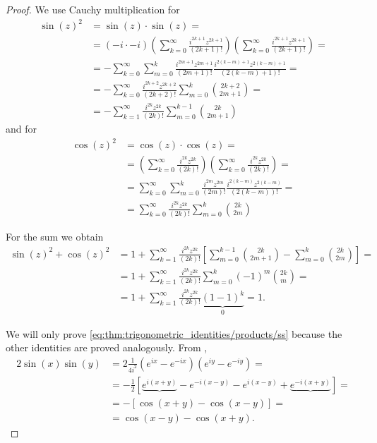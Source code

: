 \begin{proof}
   We use Cauchy multiplication for
  \begin{align*}
    \sin(z)^2
     & =
    \sin(z) \cdot \sin(z)
    =    \\ &=
    (-i \cdot -i) \left( \sum_{k=0}^\infty \frac {i^{2k+1} z^{2k+1}} {(2k+1)!} \right) \left( \sum_{k=0}^\infty \frac {i^{2k+1} z^{2k+1}} {(2k+1)!} \right)
    =    \\ &=
    -\sum_{k=0}^\infty \sum_{m=0}^k \frac {i^{2m+1} z^{2m+1}} {(2m+1)!} \frac {i^{2(k-m)+1} z^{2(k-m)+1}} {(2(k-m)+1)!}
    =    \\ &=
    -\sum_{k=0}^\infty \frac {i^{2k+2} z^{2k+2}} {(2k+2)!} \sum_{m=0}^k \binom {2k+2} {2m+1}
    =    \\ &=
    -\sum_{k=1}^\infty \frac {i^{2k} z^{2k}} {(2k)!} \sum_{m=0}^{k-1} \binom {2k} {2m+1}
  \end{align*}
  and for
  \begin{align*}
    \cos(z)^2
     & =
    \cos(z) \cdot \cos(z)
    =    \\ &=
    \left( \sum_{k=0}^\infty \frac {i^{2k} z^{2k}} {(2k)!} \right) \left( \sum_{k=0}^\infty \frac {i^{2k} z^{2k}} {(2k)!} \right)
    =    \\ &=
    \sum_{k=0}^\infty \sum_{m=0}^k \frac {i^{2m} z^{2m}} {(2m)!} \frac {i^{2(k-m)} z^{2(k-m)}} {(2(k-m))!}
    =    \\ &=
    \sum_{k=0}^\infty \frac {i^{2k} z^{2k}} {(2k)!} \sum_{m=0}^k \binom {2k} {2m}
  \end{align*}

  For the sum we obtain
  \begin{align*}
    \sin(z)^2 + \cos(z)^2
     & =
    1 + \sum_{k=1}^\infty \frac {i^{2k} z^{2k}} {(2k)!} \left[ \sum_{m=0}^{k-1} \binom {2k} {2m+1} - \sum_{m=0}^k \binom {2k} {2m} \right]
    =    \\ &=
    1 + \sum_{k=1}^\infty \frac {i^{2k} z^{2k}} {(2k)!} \sum_{m=0}^k (-1)^m \binom {2k} m
    =    \\ &=
    1 + \sum_{k=1}^\infty \frac {i^{2k} z^{2k}} {(2k)!} \underbrace{(1 - 1)^k}_0
    =
    1.
  \end{align*}

   We will only prove \ref{eq:thm:trigonometric_identities/products/ss} because the other identities are proved analogously. From ,
  \begin{align*}
    2 \sin(x) \sin(y)
     & =
    2 \frac 1 {4i^2} (e^{ix} - e^{-ix}) (e^{iy} - e^{-iy})
    =    \\ &=
    - \frac 1 2 [\underbrace{e^{i(x+y)}} - e^{-i(x-y)} - e^{i(x-y)} + \underbrace{e^{-i(x+y)}}]
    =    \\ &=
    - \left[\cos(x + y) - \cos(x - y)\right]
    =    \\ &=
    \cos(x - y) - \cos(x + y).
  \end{align*}


\end{proof}
